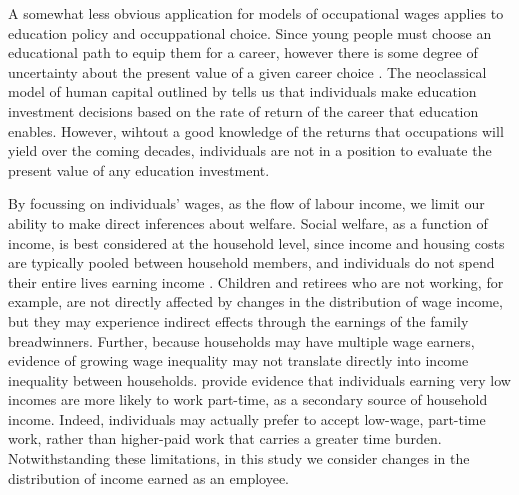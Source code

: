 A somewhat less obvious application for models of occupational wages applies to education policy and occuppational choice. Since young people must choose an educational path to equip them for a career, however there is some degree of uncertainty about the present value of a given career choice \citep[see e.g.][ch. 12]{Dixit1994}. The neoclassical model of human capital outlined by \citet{Becker2009} tells us that individuals make education investment decisions based on the rate of return of the career that education enables. However, wihtout a good knowledge of the returns that occupations will yield over the coming decades, individuals are not in a position to evaluate the present value of any education investment.

By focussing on individuals' wages, as the flow of labour income, we limit our ability to make direct inferences about welfare. Social welfare, as a function of income, is best considered at the household level, since income and housing costs are typically pooled between household members, and individuals do not spend their entire lives earning income \citep{Richardson1999,Borland1999}. Children and retirees who are not working, for example, are not directly affected by changes in the distribution of wage income, but they may experience indirect effects through the earnings of the family breadwinners. Further, because households may have multiple wage earners, evidence of growing wage inequality may not translate directly into income inequality between households. \citet{Richardson1999} provide evidence that individuals earning very low incomes are more likely to work part-time, as a secondary source of household income. Indeed, individuals may actually prefer to accept low-wage, part-time work, rather than higher-paid work that carries a greater time burden. Notwithstanding these limitations, in this study we consider changes in the distribution of income earned as an employee.

